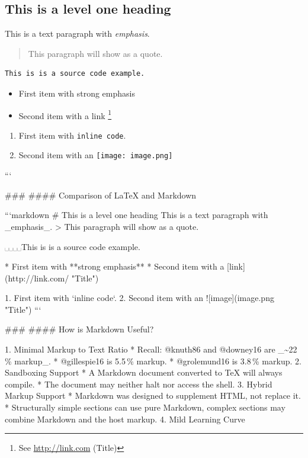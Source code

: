 \documentclass{beamer}
\begin{document}
\begin{darkframes}
\begin{frame}
\section{This is a level one heading}
This is a text paragraph with \emph{emphasis}.
\begin{quotation}This paragraph will show as a quote.\end{quotation}
\begin{verbatim}
This is is a source code example.
\end{verbatim}
\begin{itemize}
  \item First item with \alert{strong emphasis}
  \item Second item with a link%
    \footnote{See \url{http://link.com} (Title)}
\end{itemize}
\begin{enumerate}
  \item First item with \verb`inline code`.
  \item Second item with an \texttt{[image: image.png]}
\end{enumerate}
```

\end{frame}
\begin{frame}

### \subsecname
#### Comparison of \LaTeX{} and Markdown

```markdown
# This is a level one heading
This is a text paragraph with _emphasis_.
> This paragraph will show as a quote.

␣␣␣␣This is is a source code example.

* First item with **strong emphasis**
* Second item with a [link](http://link.com/ "Title")

1. First item with `inline code`.
2. Second item with an ![image](image.png "Title")
```

\end{frame}
\begin{frame}

### \subsecname
#### How is Markdown Useful?

  1. Minimal Markup to Text Ratio
    * Recall: @knuth86 and @downey16 are _\textasciitilde 22\,\% markup_.
    * @gillespie16 is 5.5\,\% markup.
    * @grolemund16 is 3.8\,\% markup.
  2. Sandboxing Support
    * A Markdown document converted to \TeX{} will always compile.
    * The document may neither halt nor access the shell.
  3. Hybrid Markup Support
    * Markdown was designed to supplement HTML, not replace it.
    * Structurally simple sections can use pure Markdown, complex sections
      may combine Markdown and the host markup.
  4. Mild Learning Curve


\end{frame}
\end{darkframes}
\end{document}
